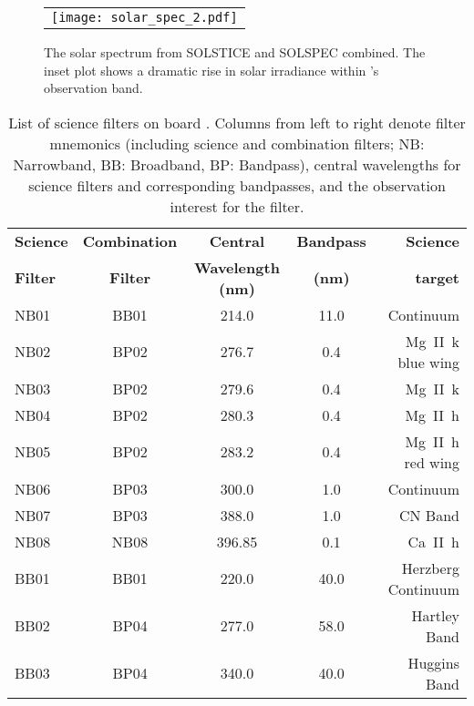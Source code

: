 \begin{figure}
    \begin{center}
    \begin{tabular}{c}
    \texttt{[image: solar\_spec\_2.pdf]}
    \end{tabular}
    \end{center}
\caption{The solar spectrum from SOLSTICE and SOLSPEC combined. The inset plot shows a dramatic rise in solar irradiance within \suit's observation band.} 
\label{fig:sun_spec} 
\end{figure} 


\begin{table*}[ht!]
\begin{center}
\begin{tabular}{||l|c|c|c|r||}
\hline
\textbf{Science}  &	\textbf{Combination} &	\textbf{Central} & \textbf{Bandpass} &\textbf{Science} \\
\textbf{Filter}	&	\textbf{Filter}     &	\textbf{Wavelength  (nm)}	&		\textbf{(nm)	}	   	&\textbf{target}		\\
\hline
NB01     & BB01 		& 214.0 		    & 11.0 		& Continuum\\
NB02 	& BP02		& 276.7				& 0.4 		& Mg~\rm{II}~k blue wing \\
NB03 	& BP02		& 279.6 			& 0.4 		& Mg~\rm{II}~k\\
NB04 	& BP02		& 280.3				& 0.4 		& Mg~\rm{II}~h\\
NB05		& BP02		& 283.2				& 0.4 		& Mg~\rm{II}~h red wing\\
NB06 	& BP03		& 300.0 			&1.0 		& Continuum\\
NB07 	& BP03		& 388.0				&1.0 		& CN Band\\
NB08		& NB08		& 396.85 			& 0.1 		& Ca~\rm{II}~h\\
BB01 	& BB01		& 220.0				& 40.0		& Herzberg Continuum \\
BB02 	& BP04		& 277.0 			& 58.0       & Hartley Band\\
BB03 	& BP04		& 340.0				& 40.0        & Huggins Band\\
\hline
\end{tabular}
\end{center}
\caption{List of science filters on board \suit. Columns from left to right denote filter mnemonics (including science and combination filters; NB: Narrowband, BB: Broadband, BP: Bandpass), central wavelengths for science filters and corresponding bandpasses, and the observation interest for the filter.} 
\label{tab:science_filters}
\end{table*}






